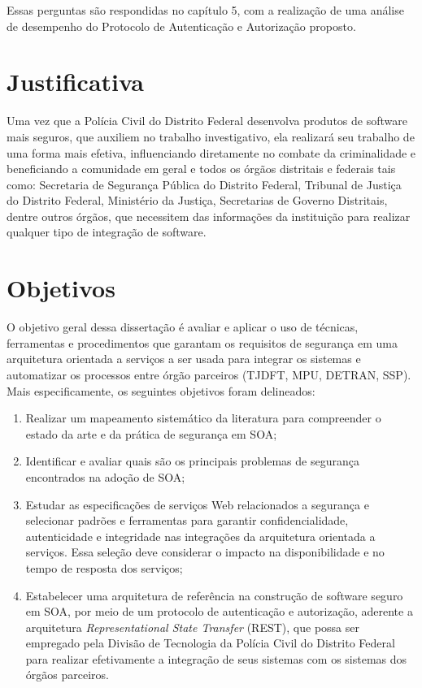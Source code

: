 Essas perguntas são respondidas no capítulo 5, com a realização de uma análise de desempenho do Protocolo de Autenticação e Autorização proposto.


\section{Justificativa}

Uma vez que a Polícia Civil do Distrito Federal desenvolva produtos de software mais seguros, que auxiliem no trabalho investigativo, ela realizará seu trabalho de uma forma mais efetiva, influenciando diretamente no combate da criminalidade e beneficiando a comunidade em geral e todos os órgãos distritais e federais tais como: Secretaria de Segurança Pública do Distrito Federal, Tribunal de Justiça do Distrito Federal, Ministério da Justiça, Secretarias de Governo Distritais, dentre outros órgãos, que necessitem das informações da instituição para realizar qualquer tipo de integração de software.

\section{Objetivos}\label{sec:Obj}
O objetivo geral dessa dissertação é avaliar e aplicar o uso de técnicas, ferramentas  e procedimentos que garantam os requisitos de segurança em uma arquitetura orientada a serviços a ser usada para integrar os sistemas e automatizar os processos entre órgão parceiros (TJDFT, MPU, DETRAN, SSP). Mais especificamente, os seguintes objetivos foram delineados:

\begin{enumerate}[a )]
	\item Realizar um mapeamento sistemático da literatura para compreender o estado da arte e da prática de segurança em SOA;

	\item Identificar e avaliar quais são os principais problemas de segurança encontrados na adoção de SOA;

	\item Estudar as especificações de serviços Web relacionados a segurança e selecionar padrões e ferramentas para garantir confidencialidade, autenticidade e integridade nas integrações da arquitetura orientada a serviços. Essa seleção deve considerar o impacto na disponibilidade e no tempo de resposta dos serviços;

    \item Estabelecer uma arquitetura de referência na construção de software seguro em SOA, por meio de um protocolo de autenticação e autorização, aderente a arquitetura \emph{Representational State Transfer} (REST), que possa ser empregado pela Divisão de Tecnologia da Polícia Civil do Distrito Federal para realizar efetivamente a integração de seus sistemas com os sistemas dos órgãos parceiros.

\end{enumerate}

